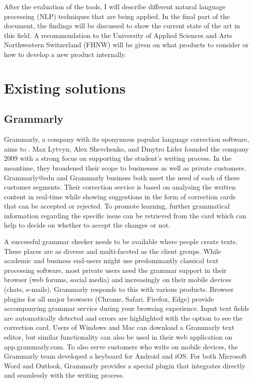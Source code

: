 \documentclass[runningheads]{llncs}
\let\OldTextregistered\textregistered
\renewcommand{\textregistered}{\OldTextregistered\xspace}
\begin{document}
After the evaluation of the tools, I will describe different natural language processing (NLP) techniques that are being applied. In the final part of the document, the findings will be discussed to show the current state of the art in this field. A recommendation to the University of Applied Sciences and Arts Northwestern Switzerland (FHNW) will be given on what products to consider or how to develop a new product internally.


\section{Existing solutions}
\subsection{Grammarly\textregistered}
Grammarly\textregistered, a company with its eponymous popular language correction software, aims to . Max Lytvyn, Alex Shevchenko, and Dmytro Lider founded the company 2009 with a strong focus on supporting the student's writing process. In the meantime, they broadened their scope to businesses as well as private customers. Grammarly\textregistered @edu and Grammarly\textregistered business both meet the need of each of these customer segments. Their correction service is based on analysing the written content in real-time while showing suggestions in the form of correction cards that can be accepted or rejected. To promote learning, further grammatical information regarding the specific issue can be retrieved from the card which can help to decide on whether to accept the changes or not. \citep{noauthor_grammarly_nodate}

A successful grammar checker needs to be available where people create texts. These places are as diverse and multi-faceted as the client groups. While academic and business end-users might use predominantly classical text processing software, most private users need the grammar support in their browser (web forums, social media) and increasingly on their mobile devices (chats, e-mails). Grammarly\textregistered responds to this with various products. Browser plugins for all major browsers (Chrome, Safari, Firefox, Edge) provide accompanying grammar service during your browsing experience. Input text fields are automatically detected and errors are highlighted with the option to see the correction card. Users of Windows and Mac can download a Grammarly\textregistered text editor, but similar functionality can also be used in their web application on app.grammarly.com. To also serve customers who write on mobile devices, the Grammarly\textregistered team developed a keyboard for Android and iOS. For both Microsoft Word and Outlook, Grammarly\textregistered provides a special plugin that integrates directly and seamlessly with the writing process.
\end{document}
